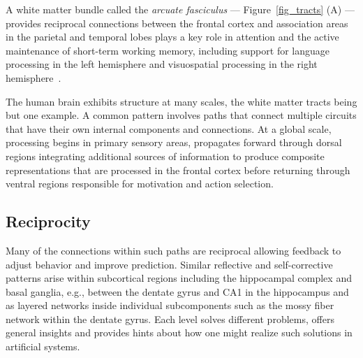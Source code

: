 \documentclass[letterpaper,11pt]{article}
\def\colorred#1{{\color{red}#1}}
\def\urlh#1{{}}
\def\emdash{---}
\begin{document}
A white matter bundle called the {\it{arcuate fasciculus}} {\emdash{}} Figure~{\urlh{#fig_White_Matter_Tracts_Long_Distance}{\ref{fig_tracts}}} ({\colorred{A}}) {\emdash{}} provides reciprocal connections between the frontal cortex and association areas in the parietal and temporal lobes plays a key role in attention and the active maintenance of short-term working memory, including support for language processing in the left hemisphere and visuospatial processing in the right hemisphere~\cite{ChicaetalBSF-18}.

The human brain exhibits structure at many scales, the white matter tracts being but one example. A common pattern involves paths that connect multiple circuits that have their own internal components and connections. At a global scale, processing begins in primary sensory areas, propagates forward through dorsal regions integrating additional sources of information to produce composite representations that are processed in the frontal cortex before returning through ventral regions responsible for motivation and action selection.


\subsection{Reciprocity}


Many of the connections within such paths are reciprocal allowing feedback to adjust behavior and improve prediction. Similar reflective and self-corrective patterns arise within subcortical regions including the hippocampal complex and basal ganglia, e.g., between the dentate gyrus and CA1 in the hippocampus and as layered networks inside individual subcomponents such as the mossy fiber network within the dentate gyrus. Each level solves different problems, offers general insights and provides hints about how one might realize such solutions in artificial systems.

\end{document}
